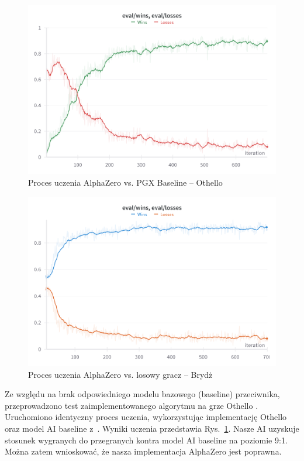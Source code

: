 \begin{figure}[h!]
    \centering
    \includegraphics[width=\textwidth]{img/wykresy/othello-eval.png}
    \caption{Proces uczenia AlphaZero vs. PGX Baseline -- Othello}
    \label{fig:othello-eval}
\end{figure}

\begin{figure}[!]
    \centering
    \includegraphics[width=\textwidth]{img/wykresy/bzero-eval.png}
    \caption{Proces uczenia AlphaZero vs. losowy gracz -- Brydż}
    \label{fig:bzero-eval}
\end{figure}

Ze względu na brak odpowiedniego modelu
bazowego (baseline) przeciwnika,
przeprowadzono test zaimplementowanego algorytmu
na grze Othello \cite{Othello}.
Uruchomiono identyczny proces uczenia,
wykorzystując implementację Othello oraz
model AI baseline z~\cite{PGX}.
Wyniki uczenia przedstawia Rys.~\ref{fig:othello-eval}.
Nasze AI uzyskuje stosunek wygranych do przegranych
kontra model AI baseline na poziomie 9:1.
Można zatem wnioskować, że nasza implementacja
AlphaZero jest poprawna.

